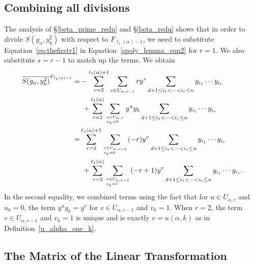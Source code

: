 \documentclass[10pt,a4paper]{article}
\begin{document}
\subsection{\label{final_red}Combining all divisions}
The analysis of \S\ref{beta_prime_redu} and \S\ref{beta_redu} shows that in order to divide $S(g_\alpha, y_k^2)$ with respect to $F_{\ell_1(\alpha)-1}$,  we need to substitute Equation~\eqref{eq:thefirstr1} in Equation~\eqref{spoly_lemma_eqn2} for $r=1$. We also substitute $s=r-1$ to match up the terms. We obtain
\begin{align}
	\overline{S(g_\alpha, y_k^2)}^{F_{\ell_1(\alpha)-1}} = &
	  - \sum_{r=2}^{\ell_1(\alpha)+1} \sum_{v \in U_{\alpha,r-1}} ry^v \sum_{d+1 \leq i_1 < \cdots < i_{r} \leq n}y_{i_1} \cdots  y_{i_{r}} \label{eq:sreduction}\\ 
	  &\  + \sum_{r=2}^{\ell_1(\alpha)}\sum_{u \in U_{\alpha,r}\atop u_k=0 \hfill} y^{u}y_k \sum_{d+1 \leq i_1 < \cdots < i_r \leq n} y_{i_1} \cdots y_{i_{r}}  
	   \notag\\
	   = &
	   \sum_{r=2}^{\ell_1(\alpha)+1} \sum_{v \in U_{\alpha,r-1}\atop v_k=0\hfill} (-r)y^v \sum_{d+1 \leq i_1 < \cdots < i_{r} \leq n}y_{i_1} \cdots  y_{i_{r}} \label{eq:sreduction2}\\ 
	  &\  + \sum_{r=2}^{\ell_1(\alpha)}\sum_{v \in U_{\alpha,r-1}\atop v_k=1 \hfill} (-r+1)y^{v} \sum_{d+1 \leq i_1 < \cdots < i_r \leq n} y_{i_1} \cdots y_{i_{r}}.
	   \notag
\end{align}
In the second equality, we combined terms using the fact that for $u \in U_{\alpha,r}$ and $u_k=0$, the term $y^uy_k=y^v$ for $v \in U_{\alpha,r-1}$ and $v_k=1$. When $r=2$, the term $v \in U_{\alpha,r-1}$ and $v_k=1$ is unique and is exactly $v=u(\alpha,k)$  as in Definition~\ref{u_alpha_one_k}.

\subsection{\label{results} The Matrix of the Linear Transformation}
\end{document}
